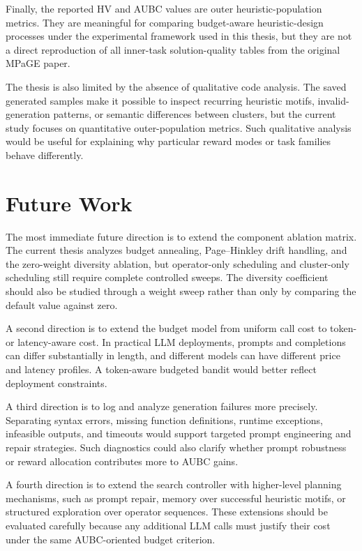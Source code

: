 \documentclass[../main.tex]{subfiles}
\begin{document}
Finally, the reported HV and AUBC values are outer heuristic-population metrics. They are meaningful for comparing budget-aware heuristic-design processes under the experimental framework used in this thesis, but they are not a direct reproduction of all inner-task solution-quality tables from the original MPaGE paper.

The thesis is also limited by the absence of qualitative code analysis. The saved generated samples make it possible to inspect recurring heuristic motifs, invalid-generation patterns, or semantic differences between clusters, but the current study focuses on quantitative outer-population metrics. Such qualitative analysis would be useful for explaining why particular reward modes or task families behave differently.

\section{Future Work}

The most immediate future direction is to extend the component ablation matrix. The current thesis analyzes budget annealing, Page--Hinkley drift handling, and the zero-weight diversity ablation, but operator-only scheduling and cluster-only scheduling still require complete controlled sweeps. The diversity coefficient should also be studied through a weight sweep rather than only by comparing the default value against zero.

A second direction is to extend the budget model from uniform call cost to token- or latency-aware cost. In practical LLM deployments, prompts and completions can differ substantially in length, and different models can have different price and latency profiles. A token-aware budgeted bandit would better reflect deployment constraints.

A third direction is to log and analyze generation failures more precisely. Separating syntax errors, missing function definitions, runtime exceptions, infeasible outputs, and timeouts would support targeted prompt engineering and repair strategies. Such diagnostics could also clarify whether prompt robustness or reward allocation contributes more to AUBC gains.

A fourth direction is to extend the search controller with higher-level planning mechanisms, such as prompt repair, memory over successful heuristic motifs, or structured exploration over operator sequences. These extensions should be evaluated carefully because any additional LLM calls must justify their cost under the same AUBC-oriented budget criterion.
\end{document}
